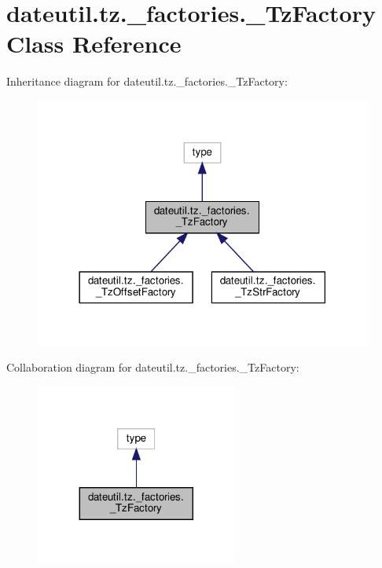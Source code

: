 \hypertarget{classdateutil_1_1tz_1_1__factories_1_1__TzFactory}{}\section{dateutil.\+tz.\+\_\+factories.\+\_\+\+Tz\+Factory Class Reference}
\label{classdateutil_1_1tz_1_1__factories_1_1__TzFactory}


Inheritance diagram for dateutil.\+tz.\+\_\+factories.\+\_\+\+Tz\+Factory\+:
\nopagebreak
\begin{figure}[H]
\begin{center}
\leavevmode
\includegraphics[width=314pt]{classdateutil_1_1tz_1_1__factories_1_1__TzFactory__inherit__graph}
\end{center}
\end{figure}


Collaboration diagram for dateutil.\+tz.\+\_\+factories.\+\_\+\+Tz\+Factory\+:
\nopagebreak
\begin{figure}[H]
\begin{center}
\leavevmode
\includegraphics[width=188pt]{classdateutil_1_1tz_1_1__factories_1_1__TzFactory__coll__graph}
\end{center}
\end{figure}
